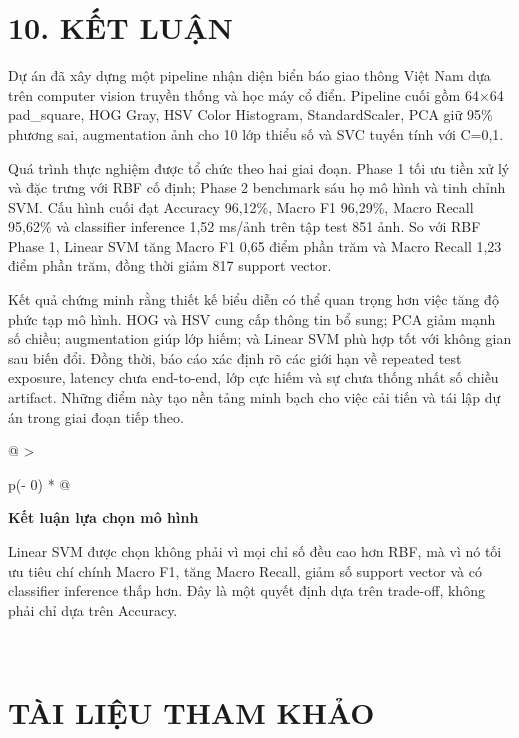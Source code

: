 \documentclass[12pt,a4paper]{article}
\begin{document}
\section{10. KẾT LUẬN}\label{kux1ebft-luux1eadn}

Dự án đã xây dựng một pipeline nhận diện biển báo giao thông Việt Nam
dựa trên computer vision truyền thống và học máy cổ điển. Pipeline cuối
gồm 64×64 pad\_square, HOG Gray, HSV Color Histogram, StandardScaler,
PCA giữ 95\% phương sai, augmentation ảnh cho 10 lớp thiểu số và SVC
tuyến tính với C=0,1.

Quá trình thực nghiệm được tổ chức theo hai giai đoạn. Phase 1 tối ưu
tiền xử lý và đặc trưng với RBF cố định; Phase 2 benchmark sáu họ mô
hình và tinh chỉnh SVM. Cấu hình cuối đạt Accuracy 96,12\%, Macro F1
96,29\%, Macro Recall 95,62\% và classifier inference 1,52 ms/ảnh trên
tập test 851 ảnh. So với RBF Phase 1, Linear SVM tăng Macro F1 0,65 điểm
phần trăm và Macro Recall 1,23 điểm phần trăm, đồng thời giảm 817
support vector.

Kết quả chứng minh rằng thiết kế biểu diễn có thể quan trọng hơn việc
tăng độ phức tạp mô hình. HOG và HSV cung cấp thông tin bổ sung; PCA
giảm mạnh số chiều; augmentation giúp lớp hiếm; và Linear SVM phù hợp
tốt với không gian sau biến đổi. Đồng thời, báo cáo xác định rõ các giới
hạn về repeated test exposure, latency chưa end-to-end, lớp cực hiếm và
sự chưa thống nhất số chiều artifact. Những điểm này tạo nền tảng minh
bạch cho việc cải tiến và tái lập dự án trong giai đoạn tiếp theo.

\begin{longtable}[]{@{}
  >{\raggedright\arraybackslash}p{(\columnwidth - 0\tabcolsep) * }@{}}
\toprule\noalign{}
\begin{minipage}[b]{\linewidth}\raggedright
\textbf{Kết luận lựa chọn mô hình}

Linear SVM được chọn không phải vì mọi chỉ số đều cao hơn RBF, mà vì nó
tối ưu tiêu chí chính Macro F1, tăng Macro Recall, giảm số support
vector và có classifier inference thấp hơn. Đây là một quyết định dựa
trên trade-off, không phải chỉ dựa trên Accuracy.
\end{minipage} \\
\midrule\noalign{}
\endhead
\bottomrule\noalign{}
\endlastfoot
\end{longtable}

\section{TÀI LIỆU THAM KHẢO}\label{tuxe0i-liux1ec7u-tham-khux1ea3o}
\end{document}
